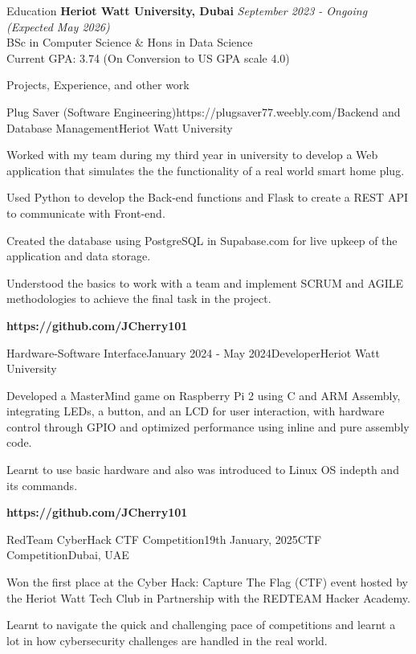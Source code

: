 \documentclass{resume}
\begin{document}
  \begin{rSection}{Education}
    {\bf Heriot Watt University, Dubai} \hfill {\em September 2023 - Ongoing (Expected May 2026)} \\ 
    { BSc in Computer Science \& Hons in Data Science} \smallskip \\
    Current GPA: 3.74 (On Conversion to US GPA scale 4.0)
  \end{rSection}
  
  \begin{rSection}{Projects, Experience, and other work}
  
    \begin{rSubsection}{Plug Saver (Software Engineering)}{https://plugsaver77.weebly.com/}{Backend and Database Management}{Heriot Watt University}
    \item Worked with my team during my third year in university to develop a Web application that simulates the the functionality of a real world smart home plug.
    \item Used Python to develop the Back-end functions and Flask to create a REST API to communicate with Front-end.
    \item Created the database using PostgreSQL in Supabase.com for live upkeep of the application and data storage.
    \item Understood the basics to work with a team and implement SCRUM and AGILE methodologies to achieve the final task in the project.
    \item \textbf{https://github.com/JCherry101}
    \end{rSubsection}
  
    \begin{rSubsection}{Hardware-Software Interface}{January 2024 - May 2024}{Developer}{Heriot Watt University}
    \item Developed a MasterMind game on Raspberry Pi 2 using C and ARM Assembly, integrating LEDs, a button, and an LCD for user interaction, with hardware control through GPIO and optimized performance using inline and pure assembly code.
    \item Learnt to use basic hardware and also was introduced to Linux OS indepth and its commands.
    \item \textbf{https://github.com/JCherry101}
    \end{rSubsection}

    \begin{rSubsection}{RedTeam CyberHack CTF Competition}{19th January, 2025}{CTF Competition}{Dubai, UAE}
    \item Won the first place at the Cyber Hack: Capture The Flag (CTF) event hosted by the Heriot Watt Tech Club in Partnership with the REDTEAM Hacker Academy.
    \item Learnt to navigate the quick and challenging pace of competitions and learnt a lot in how cybersecurity challenges are handled in the real world.
    \end{rSubsection}


\end{rSection}
\end{document}
